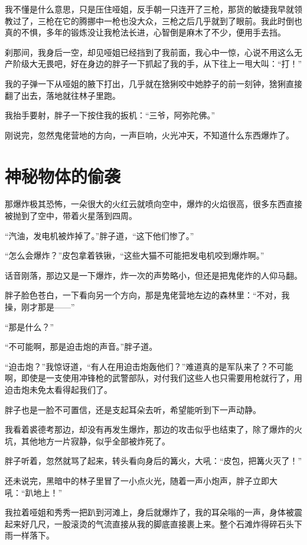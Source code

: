我不懂是什么意思，只是压住哑姐，反手朝一只连开了三枪，那货的敏捷我早就领教过了，三枪在它的腾挪中一枪也没大众，三枪之后几乎就到了眼前。我此时倒也真的不惧，多年的锻炼没让我枪法长进，心智倒是麻木了不少，便用手去挡。

刹那间，我身后一空，却见哑姐已经挡到了我前面，我心中一惊，心说不用这么无产阶级大无畏吧，好在身边的胖子一下抓起了我的手，从下往上一甩大叫：“打！”

我的子弹一下从哑姐的腋下打出，几乎就在猞猁咬中她脖子的前一刻钟，猞猁直接翻了出去，落地就往林子里跑。

我抬手要射，胖子一下按住我的扳机：“三爷，阿弥陀佛。”

刚说完，忽然鬼佬营地的方向，一声巨响，火光冲天，不知道什么东西爆炸了。

\chapter{神秘物体的偷袭}

那爆炸极其恐怖，一朵很大的火红云就喷向空中，爆炸的火焰很高，很多东西直接被抛到了空中，带着火星落到四周。

“汽油，发电机被炸掉了。”胖子道，“这下他们惨了。”

“怎么会爆炸？”皮包拿着铁锹，“这些大猫不可能把发电机咬到爆炸啊。”

话音刚落，那边又是一下爆炸，炸一次的声势略小，但还是把鬼佬炸的人仰马翻。

胖子脸色苍白，一下看向另一个方向，那是鬼佬营地左边的森林里：“不对，我操，刚才那是——”

“那是什么？”

“不可能啊，那是迫击炮的声音。”胖子道。

“迫击炮？”我惊讶道，“有人在用迫击炮轰他们？”难道真的是军队来了？不可能啊，即使是一支使用冲锋枪的武警部队，对付我们这些人也只需要用枪就行了，用迫击炮未免太看得起我们了。

胖子也是一脸不可置信，还是支起耳朵去听，希望能听到下一声动静。

我看着裘德考那边，却没有再发生爆炸，那边的攻击似乎也结束了，除了爆炸的火坑，其他地方一片寂静，似乎全部被炸死了。

胖子听着，忽然就骂了起来，转头看向身后的篝火，大吼：“皮包，把篝火灭了！”

还未说完，黑暗中的林子里冒了一小点火光，随着一声小炮声，胖子立即大吼：“趴地上！”

我拉着哑姐和秀秀一把趴到河滩上，身后就爆炸了，我的耳朵嗡的一声，身体被震起来好几尺，一股滚烫的气流直接从我的脚底直接裹上来。整个石滩炸得碎石头下雨一样落下。

